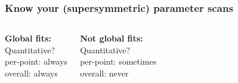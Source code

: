 \documentclass[xcolor=dvipsnames]{beamer}
\begin{document}
\begin{frame}
\frametitle{Know your (supersymmetric) parameter scans}

\begin{columns}[c]
\textbf{Global fits:}\\
\footnotesize\vspace{2mm}
Quantitative?\\
\hspace{2mm}per-point: always\\
\hspace{2mm}overall: always\vspace{15mm}

\textbf{Not global fits:}\\
\footnotesize\vspace{2mm}
Quantitative?\\
\hspace{2mm}per-point: sometimes\\
\hspace{2mm}overall: never\vspace{5mm}



\end{columns}
\end{frame}
\end{document}
